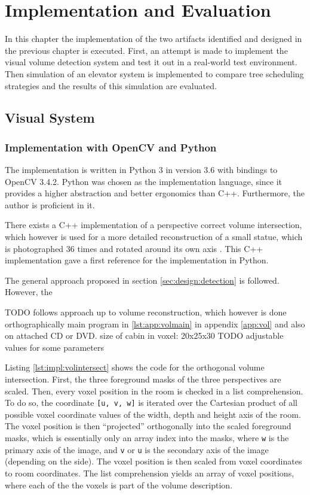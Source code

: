 \chapter{Implementation and Evaluation}
\label{chap:impl}

In this chapter the implementation of the two artifacts identified and designed in the previous chapter is executed.
First, an attempt is made to implement the visual volume detection system and test it out in a real-world test environment.
Then simulation of an elevator system is implemented to compare tree scheduling strategies and the results of this simulation are evaluated.


\section{Visual System}
\subsection{Implementation with OpenCV and Python}

The implementation is written in Python 3 in version 3.6 \autocite[][]{python2018python366}
with bindings to OpenCV 3.4.2.
Python was chosen as the implementation language, since it provides a higher abstraction and better ergonomics than C++.
Furthermore, the author is proficient in it.

There exists a C++ implementation of a perspective correct volume intersection, which however is used for a more detailed reconstruction of a small statue, which is photographed 36 times and rotated around its own axis \autocite[][]{xocoatzin2013voxelcarving}.
This C++ implementation gave a first reference for the implementation in Python.

The general approach proposed in section \ref{sec:design:detection} is followed.
However, the 

TODO
follows approach up to volume reconstruction, which however is done orthographically
main program in \ref{lst:app:volmain} in appendix \ref{app:vol} and also on attached CD or DVD.
size of cabin in voxel: 20x25x30
TODO
adjustable values for some parameters

Listing \ref{lst:impl:volintersect} shows the code for the orthogonal volume intersection.
First, the three  foreground masks of the three perspectives are scaled.
Then, every voxel position in the room is checked in a list comprehension.
To do so, the coordinate \texttt{[u, v, w]} is iterated over the Cartesian product 
of all possible voxel coordinate values of the width, depth and height axis of the room.
The voxel position is then \enquote{projected} orthogonally into the scaled foreground masks, which is essentially only an array index into the masks, where \texttt{w} is the primary axis of the image, and \texttt{v} or \texttt{u} is the secondary axis of the image (depending on the side).
The voxel position is then scaled from voxel coordinates to room coordinates.
The list comprehension yields an array of voxel positions, where each of the the voxels is part of the volume description.

